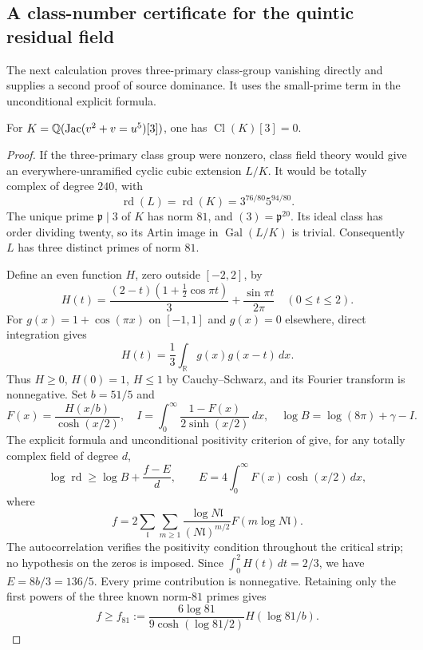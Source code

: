 \subsection{A class-number certificate for the quintic residual field}

The next calculation proves three-primary class-group vanishing
directly and supplies a second proof of source dominance.
It uses the small-prime term in the unconditional explicit formula.

\begin{proposition}\label{prop:quintic-three-class}
For $K=\mathbb Q(\operatorname{Jac}(v^2+v=u^5)[3])$, one has
$\operatorname{Cl}(K)[3]=0$.
\end{proposition}
\begin{proof}
If the three-primary class group were nonzero, class field theory
would give an everywhere-unramified cyclic cubic extension $L/K$.
It would be totally complex of degree $240$, with
\[
 \operatorname{rd}(L)=\operatorname{rd}(K)=3^{76/80}5^{94/80}.
\]
The unique prime $\mathfrak p\mid3$ of $K$ has norm $81$, and
$(3)=\mathfrak p^{20}$. Its ideal class has order dividing twenty,
so its Artin image in $\operatorname{Gal}(L/K)$ is trivial.
Consequently $L$ has three distinct primes of norm $81$.

Define an even function $H$, zero outside $[-2,2]$, by
\[
 H(t)=\frac{(2-t)(1+\tfrac12\cos\pi t)}3
       +\frac{\sin\pi t}{2\pi}\quad(0\le t\le2).
\]
For $g(x)=1+\cos(\pi x)$ on $[-1,1]$ and $g(x)=0$ elsewhere,
direct integration gives
\[
 H(t)=\frac13\int_{\mathbb R}g(x)g(x-t)\,dx.
\]
Thus $H\ge0$, $H(0)=1$, $H\le1$ by Cauchy--Schwarz, and its
Fourier transform is nonnegative. Set $b=51/5$ and
\[
 F(x)=\frac{H(x/b)}{\cosh(x/2)},\quad
 I=\int_0^\infty\frac{1-F(x)}{2\sinh(x/2)}\,dx,
 \quad \log B=\log(8\pi)+\gamma-I.
\]
The explicit formula and unconditional positivity criterion of
\citet[Eqs.~(2.3)--(2.4), p.~122]{Odlyzko1990} give, for any
totally complex field of degree $d$,
\[
 \log\operatorname{rd}\ge\log B+\frac{f-E}{d},\qquad
 E=4\int_0^\infty F(x)\cosh(x/2)\,dx,
\]
where
\[
 f=2\sum_{\mathfrak l}\sum_{m\ge1}
 \frac{\log N\mathfrak l}{(N\mathfrak l)^{m/2}}
 F(m\log N\mathfrak l).
\]
The autocorrelation verifies the positivity condition throughout
the critical strip; no hypothesis on the zeros is imposed.
Since $\int_0^2H(t)\,dt=2/3$, we have $E=8b/3=136/5$.
Every prime contribution is nonnegative. Retaining only the first
powers of the three known norm-$81$ primes gives
\[
 f\ge f_{81}:=
 \frac{6\log81}{9\cosh(\log81/2)}H(\log81/b).
\]


\end{proof}
